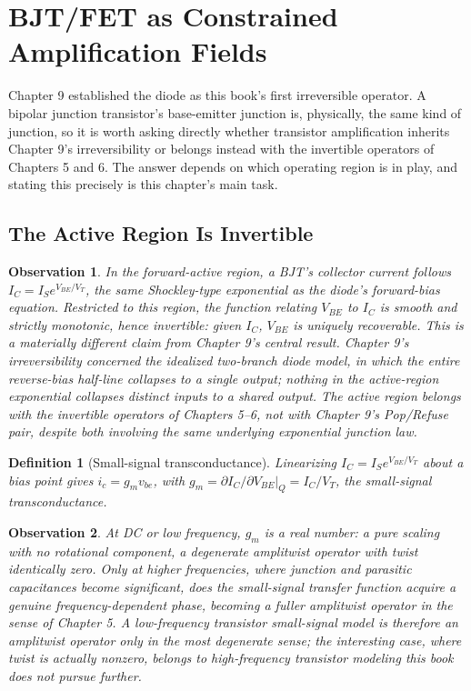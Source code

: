 \documentclass[12pt]{article}
\newtheorem{definition}{Definition}
\newtheorem{observation}{Observation}
\begin{document}
\section{BJT/FET as Constrained Amplification Fields}

Chapter 9 established the diode as this book's first irreversible operator. A bipolar junction transistor's base-emitter junction is, physically, the same kind of junction, so it is worth asking directly whether transistor amplification inherits Chapter 9's irreversibility or belongs instead with the invertible operators of Chapters 5 and 6. The answer depends on which operating region is in play, and stating this precisely is this chapter's main task.

\subsection{The Active Region Is Invertible}

\begin{observation}
In the forward-active region, a BJT's collector current follows $I_C = I_S e^{V_{BE}/V_T}$, the same Shockley-type exponential as the diode's forward-bias equation. Restricted to this region, the function relating $V_{BE}$ to $I_C$ is smooth and strictly monotonic, hence invertible: given $I_C$, $V_{BE}$ is uniquely recoverable. This is a materially different claim from Chapter 9's central result. Chapter 9's irreversibility concerned the idealized two-branch diode model, in which the entire reverse-bias half-line collapses to a single output; nothing in the active-region exponential collapses distinct inputs to a shared output. The active region belongs with the invertible operators of Chapters 5--6, not with Chapter 9's Pop/Refuse pair, despite both involving the same underlying exponential junction law.
\end{observation}

\begin{definition}[Small-signal transconductance]
Linearizing $I_C = I_Se^{V_{BE}/V_T}$ about a bias point gives $i_c = g_m v_{be}$, with $g_m = \partial I_C/\partial V_{BE}\big|_{Q} = I_C/V_T$, the small-signal transconductance.
\end{definition}

\begin{observation}
At DC or low frequency, $g_m$ is a real number: a pure scaling with no rotational component, a degenerate amplitwist operator with twist identically zero. Only at higher frequencies, where junction and parasitic capacitances become significant, does the small-signal transfer function acquire a genuine frequency-dependent phase, becoming a fuller amplitwist operator in the sense of Chapter 5. A low-frequency transistor small-signal model is therefore an amplitwist operator only in the most degenerate sense; the interesting case, where twist is actually nonzero, belongs to high-frequency transistor modeling this book does not pursue further.
\end{observation}
\end{document}
